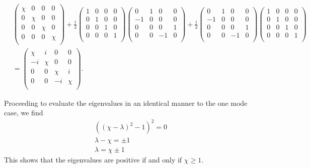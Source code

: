\documentclass[11pt,a4paper]{article}
\numberwithin{equation}{section}
\begin{document}
	\begin{align*}
	&\begin{pmatrix}
	\chi & 0 & 0 & 0\\
	0 & \chi & 0 & 0\\
	0 & 0 & \chi & 0 \\
	0 & 0 & 0 & \chi\\
	\end{pmatrix} + \frac{i}{2}\begin{pmatrix}
	1 & 0 & 0 & 0\\
	0 & 1 & 0 & 0\\
	0 & 0 & 1 & 0 \\
	0 & 0 & 0 & 1\\
	\end{pmatrix}\begin{pmatrix}
	0 & 1 & 0 & 0 \\
	-1 & 0 & 0 & 0\\
	0 & 0 & 0 & 1\\
	0 & 0 & -1 & 0\\
	\end{pmatrix} + \frac{i}{2}\begin{pmatrix}
	0 & 1 & 0 & 0 \\
	-1 & 0 & 0 & 0\\
	0 & 0 & 0 & 1\\
	0 & 0 & -1 & 0\\
	\end{pmatrix}\begin{pmatrix}
	1 & 0 & 0 & 0\\
	0 & 1 & 0 & 0\\
	0 & 0 & 1 & 0 \\
	0 & 0 & 0 & 1\\
	\end{pmatrix}&\\
	&=\begin{pmatrix}
	\chi & i & 0 & 0 \\
	-i & \chi & 0 & 0\\
	0 & 0 & \chi & i\\
	0 & 0 & -i & \chi\\
	\end{pmatrix}.
	\end{align*}
	
	Proceeding to evaluate the eigenvalues in an identical manner to the one mode case, we find
	\begin{align*}
    &((\chi-\lambda)^2 - 1)^2=0&\\
        &\lambda-\chi=\pm1&\\
	&\lambda = \chi \pm 1&
	\end{align*}
	This shows that the eigenvalues are positive if and only if $\chi \geq 1$.
	
\end{document}
